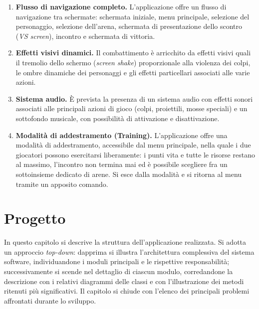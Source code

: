 \documentclass[12pt,a4paper]{report}
\begin{document}
\begin{enumerate}
  \item \textbf{Flusso di navigazione completo.} L'applicazione offre un flusso di navigazione tra schermate: schermata iniziale, menu principale, selezione del personaggio, selezione dell'arena, schermata di presentazione dello scontro (\emph{VS screen}), incontro e schermata di vittoria.

  \item \textbf{Effetti visivi dinamici.} Il combattimento è arricchito da effetti visivi quali il tremolio dello schermo (\emph{screen shake}) proporzionale alla violenza dei colpi, le ombre dinamiche dei personaggi e gli effetti particellari associati alle varie azioni.

  \item \textbf{Sistema audio.} È prevista la presenza di un sistema audio con effetti sonori associati alle principali azioni di gioco (colpi, proiettili, mosse speciali) e un sottofondo musicale, con possibilità di attivazione e disattivazione.

  \item \textbf{Modalità di addestramento (Training).} L'applicazione offre una modalità di addestramento, accessibile dal menu principale, nella quale i due giocatori possono esercitarsi liberamente: i punti vita e tutte le risorse restano al massimo, l'incontro non termina mai ed è possibile scegliere fra un sottoinsieme dedicato di arene. Si esce dalla modalità e si ritorna al menu tramite un apposito comando.

\end{enumerate}



\chapter{Progetto}\label{ch:prog}
In questo capitolo si descrive la struttura dell'applicazione realizzata. Si adotta un approccio \emph{top-down}: dapprima si illustra l'architettura complessiva del sistema software, individuandone i moduli principali e le rispettive responsabilità; successivamente si scende nel dettaglio di ciascun modulo, corredandone la descrizione con i relativi diagrammi delle classi e con l'illustrazione dei metodi ritenuti più significativi. Il capitolo si chiude con l'elenco dei principali problemi affrontati durante lo sviluppo.
\end{document}
